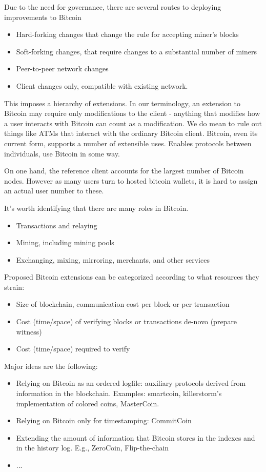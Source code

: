 Due to the need for governance, there are several routes to deploying improvements to Bitcoin
\begin{itemize}
\item Hard-forking changes that change the rule for accepting miner's blocks
\item Soft-forking changes, that require changes to a substantial number of miners
\item Peer-to-peer network changes
\item Client changes only, compatible with existing network.
\end{itemize}

This imposes a hierarchy of extensions. In our terminology, an extension to Bitcoin may require only modifications to the client - anything that modifies how a user interacts with Bitcoin can count as a modification. We do mean to rule out things like ATMs that interact with the ordinary Bitcoin client. Bitcoin, even its current form, supports a number of extensible uses. Enables protocols between individuals, use Bitcoin in some way.

On one hand, the reference client accounts for the largest number of Bitcoin nodes. However as many users turn to hosted bitcoin wallets, it is hard to assign an actual user number to these.

It's worth identifying that there are many roles in Bitcoin.
\begin{itemize}
\item Transactions and relaying
\item Mining, including mining pools
\item Exchanging, mixing, mirroring, merchants, and other services
\end{itemize}
 
Proposed Bitcoin extensions can be categorized according to what resources they strain:
\begin{itemize}
\item Size of blockchain, communication cost per block or per transaction
\item Cost (time/space) of verifying blocks or transactions de-novo (prepare witness)
\item Cost (time/space) required to verify
\end{itemize}

Major ideas are the following:
\begin{itemize}
\item Relying on Bitcoin as an ordered logfile: auxiliary protocols derived from information in the blockchain. Examples: smartcoin, killerstorm's implementation of colored coins, MasterCoin.
\item Relying on Bitcoin only for timestamping: CommitCoin
\item Extending the amount of information that Bitcoin stores in the indexes and in the history log. E.g., ZeroCoin, Flip-the-chain
\item ...
\end{itemize}



